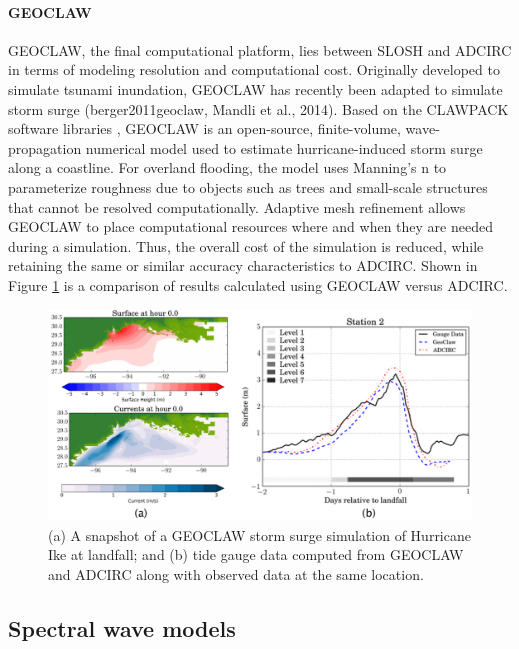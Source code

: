 \paragraph{GEOCLAW} GEOCLAW, the final computational platform, lies between SLOSH and ADCIRC in terms of modeling resolution and computational cost. Originally developed to simulate tsunami inundation, GEOCLAW has recently been adapted to simulate storm surge (berger2011geoclaw, Mandli et al., 2014). Based on the CLAWPACK software libraries \citep{leveque2002finite}, GEOCLAW is an open-source, finite-volume, wave-propagation numerical model used to estimate hurricane-induced storm surge along a coastline. For overland flooding, the model uses Manning's n to parameterize roughness due to objects such as trees and small-scale structures that cannot be resolved computationally. Adaptive mesh refinement allows GEOCLAW to place computational resources where and when they are needed during a simulation. Thus, the overall cost of the simulation is reduced, while retaining the same or similar accuracy characteristics to ADCIRC. Shown in Figure \ref{fig:GEOCLAW_ADCIRC_comparison} is a comparison of results calculated using GEOCLAW versus ADCIRC. 

\begin{figure}[htb]
    \centering
    \includegraphics[width=1.0\textwidth, angle = 0]{Figures/GEOCLAW_ADCIRC_comparison.png}
    \caption{(a) A snapshot of a GEOCLAW storm surge simulation of Hurricane Ike at landfall; and (b) tide gauge data computed from GEOCLAW and ADCIRC along with observed data at the same location. \citep{mandli2016clawpack}}
    \label{fig:GEOCLAW_ADCIRC_comparison}
\end{figure}

\subsection{Spectral wave models}

